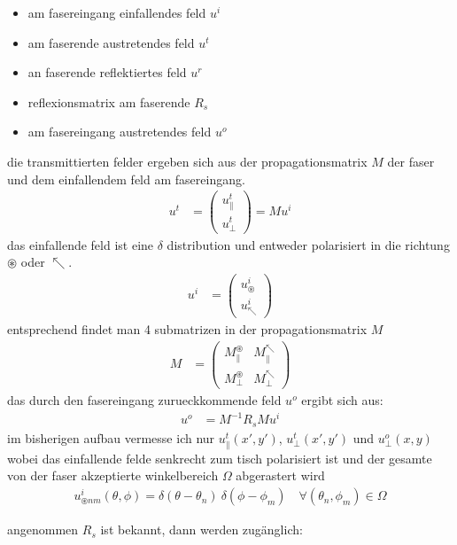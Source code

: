 \documentclass{article}
\begin{document}
\begin{itemize}
\item am fasereingang einfallendes feld $u^i$
\item am faserende austretendes feld $u^t$
\item an faserende reflektiertes feld $u^r$
\item reflexionsmatrix am faserende $R_s$
\item am fasereingang austretendes feld $u^o$
\end{itemize}

die transmittierten felder ergeben sich aus der propagationsmatrix $M$
der faser und dem einfallendem feld am fasereingang.
\begin{align}
  u^t &= \begin{pmatrix}u^t_\parallel \\ u^t_\perp\end{pmatrix} = M u^i
\end{align}
das einfallende feld ist eine $\delta$ distribution und entweder
polarisiert in die richtung $\circledast$ oder $\nwarrow$.
\begin{align}
  u^i &= \begin{pmatrix}u^i_\circledast \\ u^i_\nwarrow\end{pmatrix}
\end{align}
entsprechend findet man 4 submatrizen in der propagationsmatrix $M$
\begin{align}
  M &= \begin{pmatrix}
    M^\circledast_\parallel & M^\nwarrow_\parallel \\
    M^\circledast_\perp & M^\nwarrow_\perp 
  \end{pmatrix}
\end{align}
das durch den fasereingang zurueckkommende feld $u^o$ ergibt sich aus:
\begin{align}
  \label{eq:ruecktrafo}
  u^o &= M^{-1} R_s M u^i
\end{align}
im bisherigen aufbau vermesse ich nur $u^t_\parallel(x',y')$,
$u^t_\perp(x',y')$ und $u^o_\perp(x,y)$ wobei das einfallende felde
senkrecht zum tisch polarisiert ist und der gesamte von der faser
akzeptierte winkelbereich $\Omega$ abgerastert wird
\begin{align}
  u^i_{\circledast nm}(\theta,\phi) = \delta(\theta-\theta_n)\ \delta(\phi-\phi_m) \quad \forall (\theta_n,\phi_m)\in\Omega
\end{align}
 

angenommen $R_s$ ist bekannt, dann werden zug\"anglich: 
\end{document}
